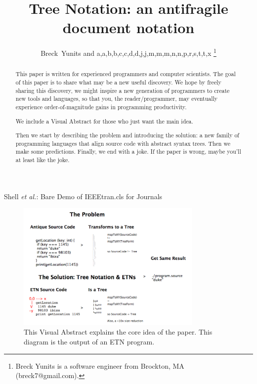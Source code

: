 \documentclass[journal]{IEEEtran}
\begin{document}
\title{Tree Notation: an antifragile document notation}

\author{Breck~Yunits and a,a,b,b,c,c,d,d,j,j,m,m,m,n,n,p,r,s,t,t,x%
\thanks{Breck Yunits is a software engineer from Brockton, MA (breck7@gmail.com).}%
}

%
{Shell \MakeLowercase{\textit{et al.}}: Bare Demo of IEEEtran.cls for Journals}

\maketitle


\begin{abstract}
This paper is written for experienced programmers and computer scientists. The goal of this paper is to share what may be a new useful discovery. We hope by freely sharing this discovery, we might inspire a new generation of programmers to create new tools and languages, so that you, the reader/programmer, may eventually experience order-of-magnitude gains in programming productivity.

We include a Visual Abstract for those who just want the main idea.

Then we start by describing the problem and introducing the solution: a new family of programming languages that align source code with abstract syntax trees. Then we make some predictions. Finally, we end with a joke. If the paper is wrong, maybe you'll at least like the joke.

\end{abstract}

\IEEEpeerreviewmaketitle

\begin{figure}[ht!]
\centering
\includegraphics[width=90mm]{treenotation.png}
\caption{This Visual Abstract explains the core idea of the paper. This diagram is the output of an ETN program.}
\end{figure}
\end{document}

